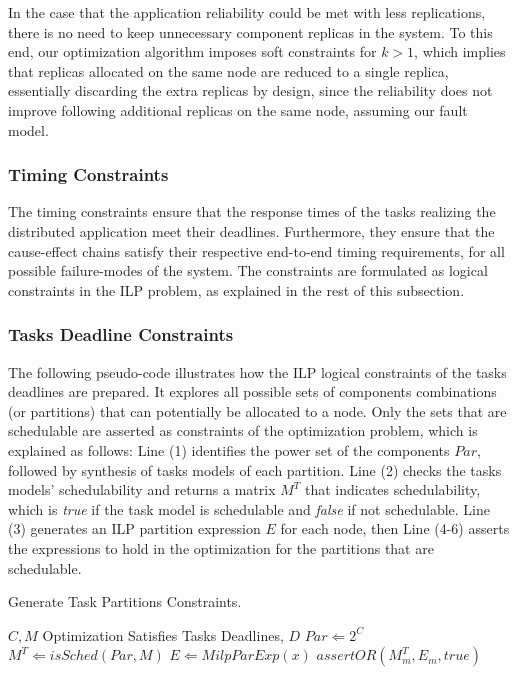 In the case that the application reliability could be met with less replications, there is no need to keep unnecessary component replicas in the system. To this end, our optimization algorithm imposes soft constraints for $k>1$, which implies that replicas allocated on the same node are reduced to a single replica, essentially discarding the extra replicas by design, since the reliability does not improve following additional replicas on the same node, assuming our fault model.

\subsubsection{Timing Constraints}
The timing constraints ensure that the response times of the tasks realizing the distributed application meet their deadlines. Furthermore, they ensure that the cause-effect chains satisfy their respective end-to-end timing requirements, for all possible failure-modes of the system. The constraints are formulated as logical constraints in the ILP problem, as explained in the rest of this subsection.

\subsubsection*{Tasks Deadline Constraints}
The following pseudo-code illustrates how the ILP logical constraints of the tasks deadlines are prepared. It explores all possible sets of components combinations (or partitions) that can potentially be allocated to a node. Only the sets that are schedulable are asserted as constraints of the optimization problem, which is explained as follows: Line (1) identifies the power set of the components $Par$, followed by synthesis of tasks models of each partition. Line (2) checks the tasks models' schedulability and returns a matrix $M^T$ that indicates schedulability, which is \textit{true} if the task model is schedulable and \textit{false} if not schedulable. Line (3) generates an ILP partition expression $E$ for each node, then Line (4-6) asserts the expressions to hold in the optimization for the partitions that are schedulable.
\begin{algorithm}
\caption{Generate Task Partitions Constraints.}\label{alg_partition}
\renewcommand{\algorithmicrequire}{\textbf{Input:}}
\begin{algorithmic}[1]
\Require $C,M$
\Ensure Optimization Satisfies Tasks Deadlines, $D$
\State $Par \Leftarrow 2^C$	
\State $M^T\Leftarrow isSched(Par, M)$
\State $E\Leftarrow MilpParExp(x)$
	\State $assertOR(M^T_m, E_m, true)$
\EndFor
\end{algorithmic}
\end{algorithm}

